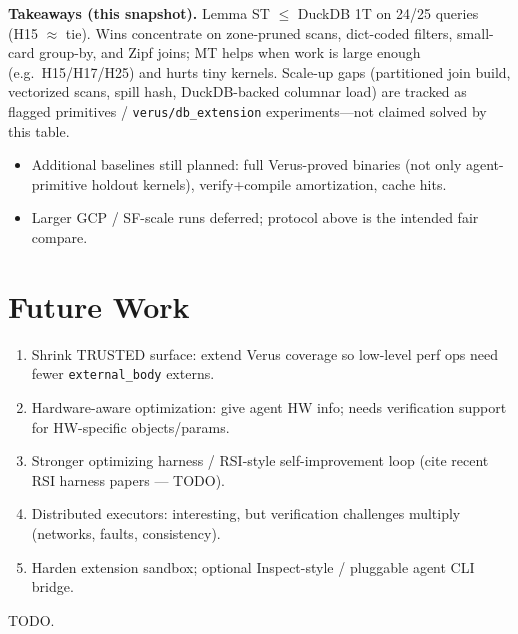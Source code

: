 \documentclass[sigconf, nonacm]{acmart}
\begin{document}
\noindent\textbf{Takeaways (this snapshot).}
Lemma ST $\le$ DuckDB 1T on 24/25 queries (H15 $\approx$ tie). Wins concentrate on
zone-pruned scans, dict-coded filters, small-card group-by, and Zipf joins; MT
helps when work is large enough (e.g.\ H15/H17/H25) and hurts tiny kernels.
Scale-up gaps (partitioned join build, vectorized scans, spill hash, DuckDB-backed
columnar load) are tracked as flagged primitives / \texttt{verus/db\_extension}
experiments---not claimed solved by this table.

\begin{itemize}
  \item Additional baselines still planned: full Verus-proved binaries (not only
        agent-primitive holdout kernels), verify+compile amortization, cache hits.
  \item Larger GCP / SF-scale runs deferred; protocol above is the intended fair compare.
\end{itemize}

\section{Future Work}

\begin{enumerate}
  \item Shrink TRUSTED surface: extend Verus coverage so low-level perf ops need fewer \texttt{external\_body} externs.
  \item Hardware-aware optimization: give agent HW info; needs verification support for HW-specific objects/params.
  \item Stronger optimizing harness / RSI-style self-improvement loop (cite recent RSI harness papers --- TODO).
  \item Distributed executors: interesting, but verification challenges multiply (networks, faults, consistency).
  \item Harden extension sandbox; optional Inspect-style / pluggable agent CLI bridge.
\end{enumerate}

\begin{acks}
TODO.
\end{acks}
\end{document}

